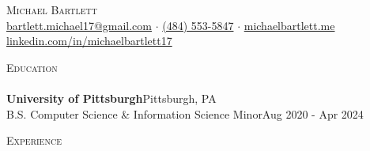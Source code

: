 \documentclass[letterpaper]{article}
\newcommand{\lineunder} {
    \vspace*{-8pt} \\
    \hspace*{-18pt} \hrulefill \\
}
\newcommand{\header} [1] {
    {\hspace*{-18pt}\vspace*{6pt} \textsc{#1}}
    \vspace*{-6pt} \lineunder
}
\begin{document}
\vspace*{-40pt}



\vspace*{-10pt}
\begin{center}
    {\fontsize{17.28pt}{20pt}\selectfont \scshape {Michael Bartlett}}\\
    \href{mailto:bartlett.michael17@gmail.com}{bartlett.michael17@gmail.com} $\cdot$ \href{tel:4845535847}{(484) 553-5847} $\cdot$ \href{http://michaelbartlett.me}{michaelbartlett.me} \href{https://www.linkedin.com/in/michaelbartlett17/}{linkedin.com/in/michaelbartlett17} \\
\end{center}

\header{Education}
\textbf{University of Pittsburgh}\hfill Pittsburgh, PA\\
B.S. Computer Science \& Information Science Minor\hfill Aug 2020 - Apr 2024\\
\vspace{2mm}

\header{Experience}
\vspace{1mm}
\end{document}
